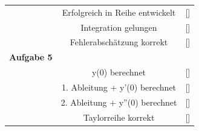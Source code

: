 \documentclass[11pt,final]{scrreprt}
\newcommand{\gbr} {\bigskip\\}
\begin{document}
\begin{tabular}{rcl}
 & Erfolgreich in Reihe entwickelt & [\hspace*{0.3cm}] \\ 
 & Integration gelungen & [\hspace*{0.3cm}] \\ 
 & Fehlerabschätzung korrekt &  [\hspace*{0.3cm}]\gbr 
\textbf{Aufgabe 5 }&  &  \\ 
 & y(0) berechnet & [\hspace*{0.3cm}] \\ 
 & 1. Ableitung + y'(0) berechnet & [\hspace*{0.3cm}] \\ 
 & 2. Ableitung + y''(0) berechnet & [\hspace*{0.3cm}] \\ 
 & Taylorreihe korrekt & [\hspace*{0.3cm}] \gbr 

\end{tabular}\\
\newpage 
\end{document}
